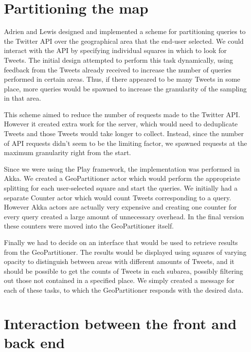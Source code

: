 \section{Partitioning the map}
\label{sec:partitioning}

Adrien and Lewis designed and implemented a scheme for partitioning queries to
the Twitter API over the geographical area that the end-user selected. We could
interact with the API by specifying individual squares in which to look for
Tweets. The initial design attempted to perform this task dynamically, using
feedback from the Tweets already received to increase the number of queries
performed in certain areas. Thus, if there appeared to be many Tweets in some
place, more queries would be spawned to increase the granularity of the
sampling in that area.

This scheme aimed to reduce the number of requests made to the Twitter API.
However it created extra work for the server, which would need to deduplicate
Tweets and those Tweets would take longer to collect. Instead, since the number
of API requests didn't seem to be the limiting factor, we spawned requests
at the maximum granularity right from the start.

Since we were using the Play framework, the implementation was performed in
Akka. We created a GeoPartitioner actor which would perform the appropriate
splitting for each user-selected square and start the queries. We initially had
a separate Counter actor which would count Tweets corresponding to a query.
However Akka actors are actually very expensive and creating one counter for
every query created a large amount of unnecessary overhead. In the final
version these counters were moved into the GeoPartitioner itself.

Finally we had to decide on an interface that would be used to retrieve results
from the GeoPartitioner. The results would be displayed using squares of
varying opacity to distinguish between areas with different amounts of Tweets,
and it should be possible to get the counts of Tweets in each subarea, possibly
filtering out those not contained in a specified place. We simply created a
message for each of these tasks, to which the GeoPartitioner responds with the
desired data.

\section{Interaction between the front and back end}
\label{sec:task_controller}

